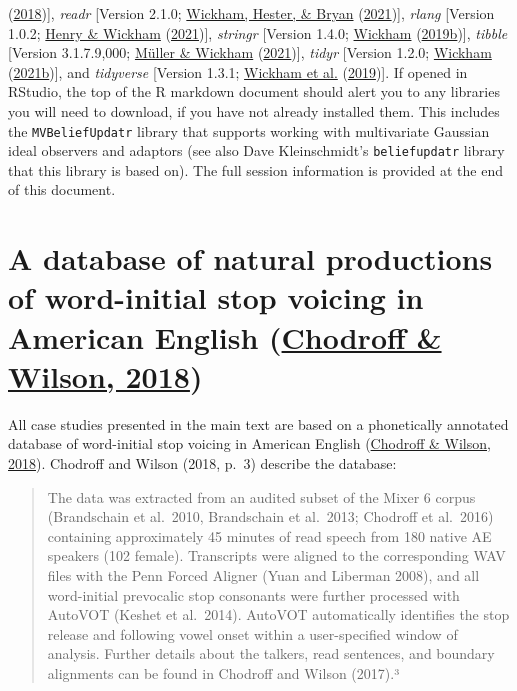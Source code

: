 \documentclass[
  11pt,
  english,
  man,floatsintext]{apa6}
\begin{document}
(\protect\hyperlink{ref-R-Rcpp_b}{2018}){]}, \emph{readr} {[}Version 2.1.0; \protect\hyperlink{ref-R-readr}{Wickham, Hester, \& Bryan} (\protect\hyperlink{ref-R-readr}{2021}){]}, \emph{rlang} {[}Version 1.0.2; \protect\hyperlink{ref-R-rlang}{Henry \& Wickham} (\protect\hyperlink{ref-R-rlang}{2021}){]}, \emph{stringr} {[}Version 1.4.0; \protect\hyperlink{ref-R-stringr}{Wickham} (\protect\hyperlink{ref-R-stringr}{2019b}){]}, \emph{tibble} {[}Version 3.1.7.9,000; \protect\hyperlink{ref-R-tibble}{Müller \& Wickham} (\protect\hyperlink{ref-R-tibble}{2021}){]}, \emph{tidyr} {[}Version 1.2.0; \protect\hyperlink{ref-R-tidyr}{Wickham} (\protect\hyperlink{ref-R-tidyr}{2021b}){]}, and \emph{tidyverse} {[}Version 1.3.1; \protect\hyperlink{ref-R-tidyverse}{Wickham et al.} (\protect\hyperlink{ref-R-tidyverse}{2019}){]}. If opened in RStudio, the top of the R markdown document should alert you to any libraries you will need to download, if you have not already installed them. This includes the \texttt{MVBeliefUpdatr} library that supports working with multivariate Gaussian ideal observers and adaptors (see also Dave Kleinschmidt's \texttt{beliefupdatr} library that this library is based on). The full session information is provided at the end of this document.

\hypertarget{sec:SI-chodroff}{%
\section{\texorpdfstring{A database of natural productions of word-initial stop voicing in American English (\protect\hyperlink{ref-chodroff-wilson2018}{Chodroff \& Wilson, 2018})}{A database of natural productions of word-initial stop voicing in American English (Chodroff \& Wilson, 2018)}}\label{sec:SI-chodroff}}

All case studies presented in the main text are based on a phonetically annotated database of word-initial stop voicing in American English (\protect\hyperlink{ref-chodroff-wilson2018}{Chodroff \& Wilson, 2018}). Chodroff and Wilson (2018, p.~3) describe the database:

\begin{quote}
The data was extracted from an audited subset of the Mixer 6 corpus (Brandschain et al.~2010, Brandschain
et al.~2013; Chodroff et al.~2016) containing approximately 45 minutes of read speech from 180 native AE
speakers (102 female). Transcripts were aligned to the corresponding WAV files with the Penn Forced Aligner
(Yuan and Liberman 2008), and all word-initial prevocalic stop consonants were further processed with
AutoVOT (Keshet et al.~2014). AutoVOT automatically identifies the stop release and following vowel onset
within a user-specified window of analysis. Further details about the talkers, read sentences, and boundary
alignments can be found in Chodroff and Wilson (2017).³
\end{quote}
\end{document}
